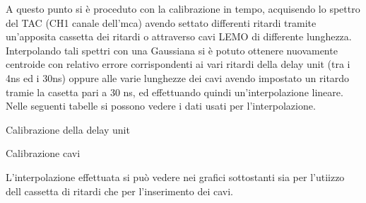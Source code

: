 A questo punto si è proceduto con la calibrazione in tempo, acquisendo lo spettro del TAC (CH1 canale dell'mca) avendo settato differenti ritardi tramite 
un'apposita cassetta dei ritardi o attraverso cavi LEMO di differente lunghezza. Interpolando tali spettri con una Gaussiana si è potuto ottenere nuovamente centroide con relativo 
errore corrispondenti ai vari ritardi della delay unit (tra i 4ns ed i 30ns) oppure alle varie lunghezze dei cavi avendo impostato un ritardo tramie la casetta pari a 30 ns,
ed effettuando quindi un'interpolazione lineare. Nelle seguenti tabelle si possono vedere i dati usati per l'interpolazione. \\
%
\begin{tabella}[h]
	\centering
	
	\caption{Calibrazione della delay unit}
	\label{tab:calib_delay}
\end{tabella}
%
%
\begin{tabella}[h]
	\centering
	
	\caption{Calibrazione cavi}
	\label{tab:calib_cavi}
\end{tabella}
%
L'interpolazione effettuata si può vedere nei grafici sottostanti sia per l'utiizzo dell cassetta di ritardi che per l'inserimento dei cavi.


